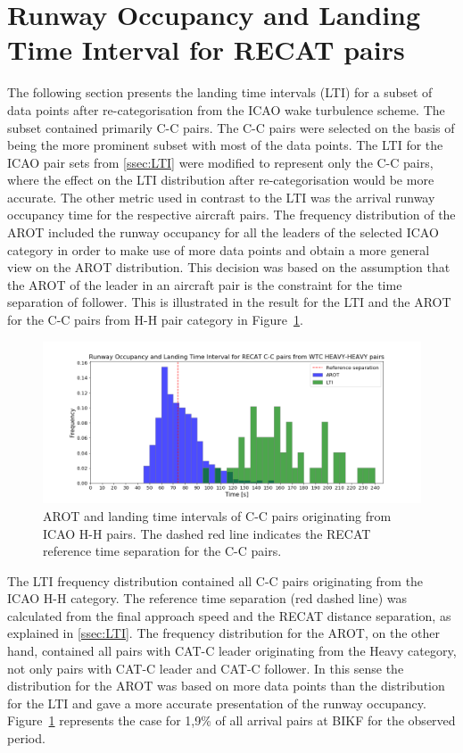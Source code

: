 \section{Runway Occupancy and Landing Time Interval for RECAT pairs}
The following section presents the landing time intervals (LTI) for a subset of data points after re-categorisation from the ICAO wake turbulence scheme. The subset contained primarily C-C pairs. The C-C pairs were selected on the basis of being the more prominent subset with most of the data points. The LTI for the ICAO pair sets from \ref{ssec:LTI} were modified to represent only the C-C pairs, where the effect on the LTI distribution after re-categorisation would be more accurate. The other metric used in contrast to the LTI was the arrival runway occupancy time for the respective aircraft pairs. The frequency distribution of the AROT included the runway occupancy for all the leaders of the selected ICAO category in order to make use of more data points and obtain a more general view on the AROT distribution. This decision was based on the assumption that the AROT of the leader in an aircraft pair is the constraint for the time separation of follower. This is illustrated in the result for the LTI and the AROT for the C-C pairs from H-H pair category in Figure~\ref{fig:CC_from_HH_pairs_time_sep}. 
\begin{figure}[h]
    \centering
    \includegraphics[width=1\textwidth]{graphics/fig_CC_from_HH_pairs_time_sep.png}
    \caption[AROT and LTI of C-C pairs originating from ICAO H-H pairs]{AROT and landing time intervals of C-C pairs originating from ICAO H-H pairs. The dashed red line indicates the RECAT reference time separation for the C-C pairs.}
    \label{fig:CC_from_HH_pairs_time_sep}
\end{figure}
The LTI frequency distribution contained all C-C pairs originating from the ICAO H-H category. The reference time separation (red dashed line) was calculated from the final approach speed and the RECAT distance separation, as explained in \ref{ssec:LTI}. The frequency distribution for the AROT, on the other hand, contained all pairs with CAT-C leader originating from the Heavy category, not only pairs with CAT-C leader and CAT-C follower. In this sense the distribution for the AROT was based on more data points than the distribution for the LTI and gave a more accurate presentation of the runway occupancy. Figure~\ref{fig:CC_from_HH_pairs_time_sep} represents the case for 1,9\% of all arrival pairs at BIKF for the observed period.\\

